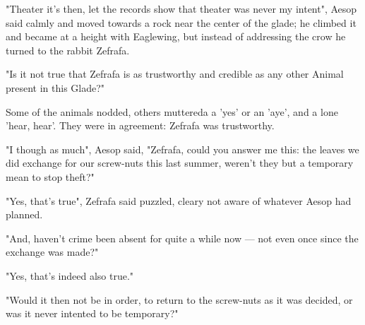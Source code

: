 
"Theater it's then, let the records show that theater was never my intent", Aesop said calmly and moved towards a rock near the center of the glade; he climbed it and became at a height with Eaglewing, but instead of addressing the crow he turned to the rabbit Zefrafa.

"Is it not true that Zefrafa is as trustworthy and credible as any other Animal present in this Glade?"


Some of the animals nodded, others muttereda a 'yes' or an 'aye', and a lone 'hear, hear'. They were in agreement: Zefrafa was trustworthy.

"I though as much", Aesop said, "Zefrafa, could you answer me this: the leaves we did exchange for our screw-nuts this last summer, weren't they but a temporary mean to stop theft?"

"Yes, that's true", Zefrafa said puzzled, cleary not aware of whatever Aesop had planned.

"And, haven't crime been absent for quite a while now — not even once since the exchange was made?"

"Yes, that's indeed also true."

"Would it then not be in order, to return to the screw-nuts as it was decided, or was it never intented to be temporary?"






